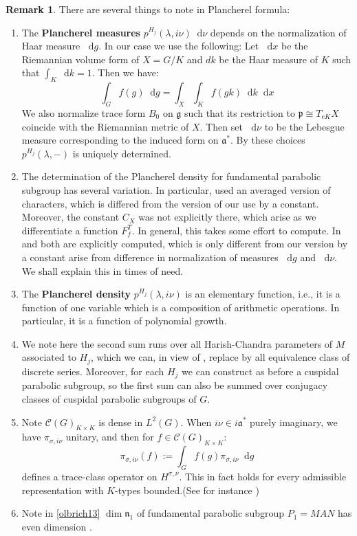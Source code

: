 \documentclass[11pt]{report}
\theoremstyle{definition}
\newtheorem{Rmk}{Remark}[chapter]
\theoremstyle{plain}
\newcommand{\mass}[1]{\mathop{}\mathrm{d}{#1}}
\newcommand{\Lie}[1]{\mathfrak{#1}}
\begin{document}
\begin{Rmk}\label{normalization}
	There are several things to note in Plancherel formula:
	\begin{enumerate}
		\item The \textbf{Plancherel measures} $p^{H_j}(\lambda, i\nu)\mass{\nu}$ depends on the normalization of Haar measure $\mass{g}$. In our case we use the following: Let $\mass{x}$ be the Riemannian volume form of $X=G/K$ and $dk$ be the Haar measure of $K$ such that $\int_K\mass{k}=1$. Then we have:
		\begin{equation}
		\int_G f(g)\mass{g}=\int_X\int_K f(gk)\mass{k}\mass{x}
		\end{equation}
		We also normalize trace form $B_0$ on $\Lie{g}$ such that its restriction to $\Lie{p}\cong T_{eK}X$ coincide with the Riemannian metric of $X$. Then set $\mass{\nu}$ to be the Lebesgue measure corresponding to the induced form on $\Lie{a}^*$. By these choices $p^{H_j}(\lambda, -)$ is uniquely determined.
		\item The determination of the Plancherel density for fundamental parabolic subgroup has several variation. In particular, \cite{knapp2016} used an averaged version of characters, which is differed from the version of our use by a constant. Moreover, the constant $C_X$ was not explicitly there, which arise as we differentiate a function $F^T_f$. In general, this takes some effort to compute. In \cite{harish1975} and \cite{harish1976} both are explicitly computed, which is only different from our version by a constant arise from difference in normalization of measures $\mass{g}$ and $\mass{\nu}$. We shall explain this in times of need.
		\item The \textbf{Plancherel density} $p^{H_j}(\lambda, i\nu)$ is an elementary function, i.e., it is a function of one variable which is a composition of arithmetic operations. In particular, it is a function of polynomial growth.
		\item We note here the second sum runs over all Harish-Chandra parameters of $M$ associated to $H_j$, which we can, in view of , replace by all equivalence class of discrete series. Moreover, for each $H_j$ we can construct as before a cuspidal parabolic subgroup, so the first sum can also be summed over conjugacy classes of cuspidal parabolic subgroups of $G$.
		\item Note $\mathcal{C}(G)_{K\times K}$ is dense in $L^2(G)$. When $i\nu\in i\Lie{a}^*$ purely imaginary, we have $\pi_{\sigma, i\nu}$ unitary, and then for $f\in \mathcal{C}(G)_{K\times K}$:
		\begin{equation}
		\pi_{\sigma, i\nu}(f):=\int_G f(g)\pi_{\sigma, i\nu}\mass{g}
		\end{equation}
		defines a trace-class operator on $H^{\sigma, \nu}$. This in fact holds for every admissible representation with $K$-types bounded.(See for instance \cite[Theorem~10.2]{knapp2016})	
		\item Note in \ref{olbrich13} $\dim \Lie{n}_1$ of fundamental parabolic subgroup $P_1=MAN$ has even dimension \cite[Chapter~III, Lemma 4.2(i)]{borel2013}. 
	\end{enumerate}
\end{Rmk}
\end{document}
